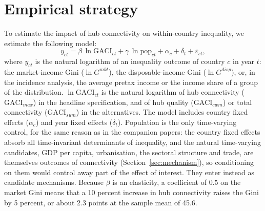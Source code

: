 \section{Empirical strategy}
\label{sec:strategy}
To estimate the impact of hub connectivity on within-country inequality, we estimate the following model:
\begin{equation}
y_{ct} = \beta\,\ln\mathrm{GACI}_{ct} + \gamma\,\ln\text{pop}_{ct} + \alpha_c + \delta_t + \varepsilon_{ct},
\label{eq:main}
\end{equation}
where $y_{ct}$ is the natural logarithm of an inequality outcome of country $c$ in year $t$: the market-income Gini ($\ln G^{mkt}$), the disposable-income Gini ($\ln G^{disp}$), or, in the incidence analysis, the average pretax income or the income share of a group of the distribution. $\ln\mathrm{GACI}_{ct}$ is the natural logarithm of hub connectivity ($\mathrm{GACI}_{max}$) in the headline specification, and of hub quality ($\mathrm{GACI}_{cwm}$) or total connectivity ($\mathrm{GACI}_{sum}$) in the alternatives. The model includes country fixed effects ($\alpha_c$) and year fixed effects ($\delta_t$). Population is the only time-varying control, for the same reason as in the companion papers: the country fixed effects absorb all time-invariant determinants of inequality, and the natural time-varying candidates, GDP per capita, urbanisation, the sectoral structure and trade, are themselves outcomes of connectivity (Section~\ref{sec:mechanism}), so conditioning on them would control away part of the effect of interest. They enter instead as candidate mechanisms. Because $\beta$ is an elasticity, a coefficient of $0.5$ on the market Gini means that a 10 percent increase in hub connectivity raises the Gini by 5 percent, or about 2.3 points at the sample mean of 45.6.

